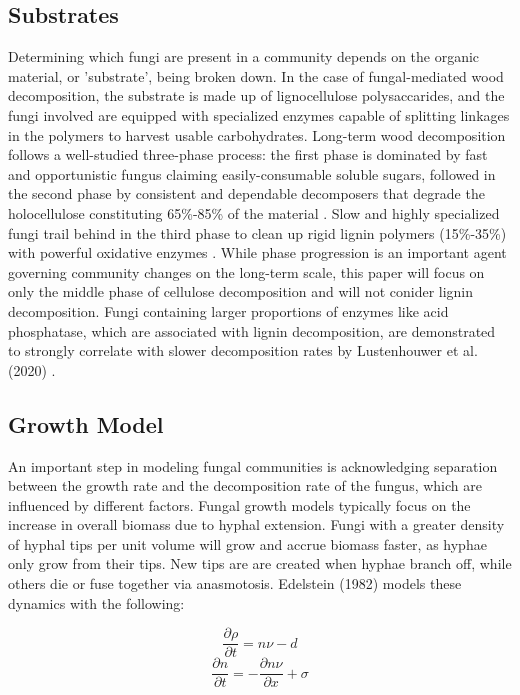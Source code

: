 \documentclass[12pt]{article}
\begin{document}
\begin{multicols}{2}
\subsection{Substrates}
Determining which fungi are present in a community depends on the organic material, or 'substrate', being broken down. In the case of fungal-mediated wood decomposition, the substrate is made up of lignocellulose polysaccarides, and the fungi involved are equipped with specialized enzymes capable of splitting linkages in the polymers to harvest usable carbohydrates. Long-term wood decomposition follows a well-studied three-phase process: the first phase is dominated by fast and opportunistic fungus claiming easily-consumable soluble sugars, followed in the second phase by consistent and dependable decomposers that degrade the holocellulose constituting 65\%-85\% of the material \cite{Segato2014}. Slow and highly specialized fungi trail behind in the third phase to clean up rigid lignin polymers (15\%-35\%) with powerful oxidative enzymes \cite{Moorhead2006}. While phase progression is an important agent governing community changes on the long-term scale, this paper will focus on only the middle phase of cellulose decomposition and will not conider lignin decomposition. Fungi containing larger proportions of enzymes like acid phosphatase, which are associated with lignin decomposition, are demonstrated to strongly correlate with slower decomposition rates by Lustenhouwer et al. (2020) \cite{Lustenhouwer2020}.

\subsection{Growth Model}
An important step in modeling fungal communities is acknowledging separation between the growth rate and the decomposition rate of the fungus, which are influenced by different factors. Fungal growth models typically focus on the increase in overall biomass due to hyphal extension. Fungi with a greater density of hyphal tips per unit volume will grow and accrue biomass faster, as hyphae only grow from their tips. New tips are are created when hyphae branch off, while others die or fuse together via anasmotosis. Edelstein (1982) models these dynamics with the following:

\begin{equation} \label{eq:1}
\frac{\partial \rho}{\partial t} = n\nu - d
\end{equation}
\begin{equation} \label{eq:2}
\frac{\partial n}{\partial t} = -\frac{\partial n\nu}{\partial x} + \sigma
\end{equation}


\end{multicols}
\end{document}
